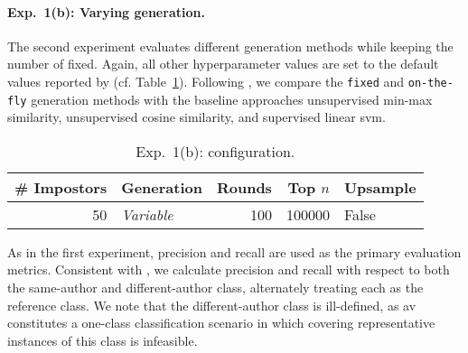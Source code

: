 \paragraph{Exp.\ 1(b): Varying \imp{} generation.}
The second experiment evaluates different \imp{} generation methods while keeping the number of \imps{} fixed.
Again, all other hyperparameter values are set to the default values reported by \citet{koppel_determining_2014} (cf. Table~\ref{tab:repr_exp2}). 
Following \citet{koppel_determining_2014}, we compare the \texttt{fixed} and \texttt{on-the-fly} \imp{} generation methods with the baseline approaches unsupervised min-max similarity, unsupervised cosine similarity, and supervised linear \ac{svm}.

\begin{table}[h]
\centering\small
\caption{Exp.\ 1(b): \impAppr{} configuration.}
\label{tab:repr_exp2}
\begin{tabular}{@{}rlrrl@{}}   %
\toprule
\# Impostors & Generation & Rounds & Top $n$ & Upsample \\
\midrule
50 & \textit{Variable} & 100 & \num{100000} & False \\
\bottomrule
\end{tabular}%
\end{table}

As in the first experiment, precision and recall are used as the primary evaluation metrics. 
Consistent with \citet{koppel_determining_2014}, we calculate precision and recall with respect to both the same-author and different-author class, alternately treating each as the reference class.
We note that the different-author class is ill-defined, as \ac{av} constitutes a one-class classification scenario in which covering representative instances of this class is infeasible.